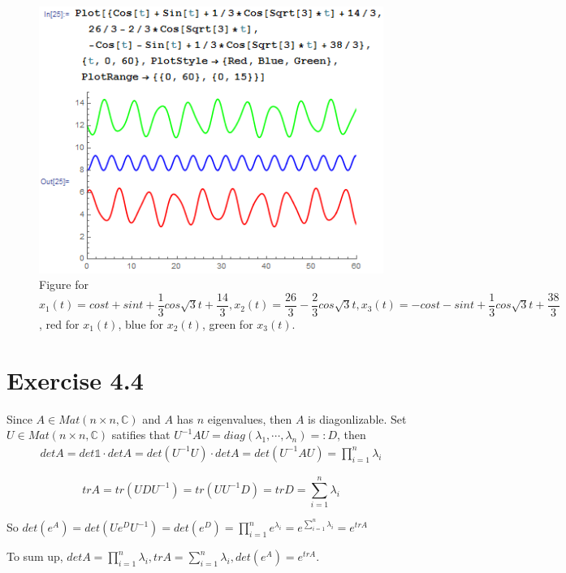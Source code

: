 \documentclass[a4paper,12pt,titlepage]{article}
\begin{document}
\begin{figure}[H]
    \centering
    \includegraphics[width=14
    cm]{6.png}
    \caption{Figure for $x_1(t)=cost+sint+\dfrac{1}{3}cos\sqrt{3}t+\dfrac{14}{3},x_2(t)=\dfrac{26}{3}-\dfrac{2}{3}cos\sqrt{3}t,x_3(t)=
-cost-sint+\dfrac{1}{3}cos\sqrt{3}t+\dfrac{38}{3}$, red for $x_1(t)$, blue for $x_2(t)$, green for $x_3(t)$.}
\end{figure}

\section*{Exercise 4.4}
Since $A\in Mat(n\times n,\mathbb{C})$ and $A$ has $n$ eigenvalues, then $A$ is diagonlizable. Set $U\in  Mat(n\times n,\mathbb{C})$ satifies that
$U^{-1}AU=diag(\lambda_1, \cdots , \lambda_n)=:D$, then
\begin{align*}
detA=det\mathds{1}\cdot detA=det(U^{-1}U)\cdot detA=det(U^{-1}AU)=
\prod_{i=1}^n\lambda_i
\end{align*}

$$trA=tr(UDU^{-1})=tr(UU^{-1}D)=trD=\sum\limits_{i=1}^n\lambda_i$$

So $det(e^A)=det(Ue^DU^{-1})=det(e^D)=\prod_{i=1}^ne^{\lambda_i}=e^{\sum\limits_{i=1}^n\lambda_i}=e^{trA}$

To sum up, $detA=\prod_{i=1}^n\lambda_i,trA=\sum\limits_{i=1}^n\lambda_i,det(e^A)=e^{trA}$.
\end{document}
